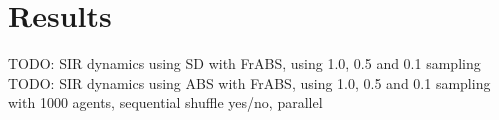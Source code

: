 \section{Results}

TODO: SIR dynamics using SD with FrABS, using 1.0, 0.5 and 0.1 sampling 
TODO: SIR dynamics using ABS with FrABS, using 1.0, 0.5 and 0.1 sampling with 1000 agents, sequential shuffle yes/no, parallel
